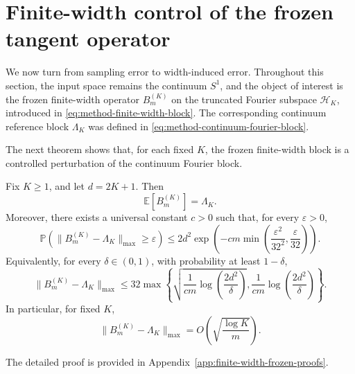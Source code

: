 \section{Finite-width control of the frozen tangent operator}
\label{sec:results-finite-width-frozen}

We now turn from sampling error to width-induced error. Throughout this section, the input
space remains the continuum \(S^1\), and the object of interest is the frozen finite-width
operator \(B_m^{(K)}\) on the truncated Fourier subspace \(\mathcal H_K\), introduced in
\eqref{eq:method-finite-width-block}. The corresponding continuum reference block
\(\Lambda_K\) was defined in \eqref{eq:method-continuum-fourier-block}.

The next theorem shows that, for each fixed \(K\), the frozen finite-width block is a
controlled perturbation of the continuum Fourier block.

\begin{theorem}
	\label{thm:results-finite-width-frozen-concentration}
	Fix \(K\ge 1\), and let \(d=2K+1\). Then
	\begin{equation}
		\mathbb E[B_m^{(K)}]=\Lambda_K.
		\label{eq:results-finite-width-mean}
	\end{equation}
	Moreover, there exists a universal constant \(c>0\) such that, for every
	\(\varepsilon>0\),
	\begin{equation}
		\mathbb P\!\left(
		\|B_m^{(K)}-\Lambda_K\|_{\max}\ge \varepsilon
		\right)
		\le
		2d^2
		\exp\!\left(
		-cm\min\!\left(\frac{\varepsilon^2}{32^2},\frac{\varepsilon}{32}\right)
		\right).
		\label{eq:results-finite-width-max-bound}
	\end{equation}
	Equivalently, for every \(\delta\in(0,1)\), with probability at least
	\(1-\delta\),
	\begin{equation}
		\|B_m^{(K)}-\Lambda_K\|_{\max}
		\le
		32\max\left\{
		\sqrt{\frac{1}{cm}\log\!\left(\frac{2d^2}{\delta}\right)},
		\frac{1}{cm}\log\!\left(\frac{2d^2}{\delta}\right)
		\right\}.
		\label{eq:results-finite-width-high-prob-bound}
	\end{equation}
	In particular, for fixed \(K\),
	\begin{equation}
		\|B_m^{(K)}-\Lambda_K\|_{\max}
		=
		O \!\left(\sqrt{\frac{\log K}{m}}\right).
		\label{eq:results-finite-width-rate}
	\end{equation}
\end{theorem}

The detailed proof is provided in Appendix~\ref{app:finite-width-frozen-proofs}.

